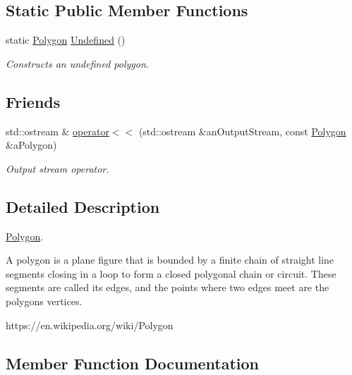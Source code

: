 \subsection*{Static Public Member Functions}
\begin{DoxyCompactItemize}
\item 
static \hyperlink{classlibrary_1_1math_1_1geom_1_1d3_1_1objects_1_1_polygon}{Polygon} \hyperlink{classlibrary_1_1math_1_1geom_1_1d3_1_1objects_1_1_polygon_aba08898d8cb7ac1623bb56a2eee8962d}{Undefined} ()
\begin{DoxyCompactList}\small\item\em Constructs an undefined polygon. \end{DoxyCompactList}\end{DoxyCompactItemize}
\subsection*{Friends}
\begin{DoxyCompactItemize}
\item 
std\+::ostream \& \hyperlink{classlibrary_1_1math_1_1geom_1_1d3_1_1objects_1_1_polygon_ae57177a1fae265be31aca4cdcd6add82}{operator$<$$<$} (std\+::ostream \&an\+Output\+Stream, const \hyperlink{classlibrary_1_1math_1_1geom_1_1d3_1_1objects_1_1_polygon}{Polygon} \&a\+Polygon)
\begin{DoxyCompactList}\small\item\em Output stream operator. \end{DoxyCompactList}\end{DoxyCompactItemize}


\subsection{Detailed Description}
\hyperlink{classlibrary_1_1math_1_1geom_1_1d3_1_1objects_1_1_polygon}{Polygon}. 

A polygon is a plane figure that is bounded by a finite chain of straight line segments closing in a loop to form a closed polygonal chain or circuit. These segments are called its edges, and the points where two edges meet are the polygon\textquotesingle{}s vertices.

https\+://en.wikipedia.\+org/wiki/\+Polygon 

\subsection{Member Function Documentation}
\mbox{\label{classlibrary_1_1math_1_1geom_1_1d3_1_1objects_1_1_polygon_a2dad7a1309d367e388fdf6a8141557da}} 
